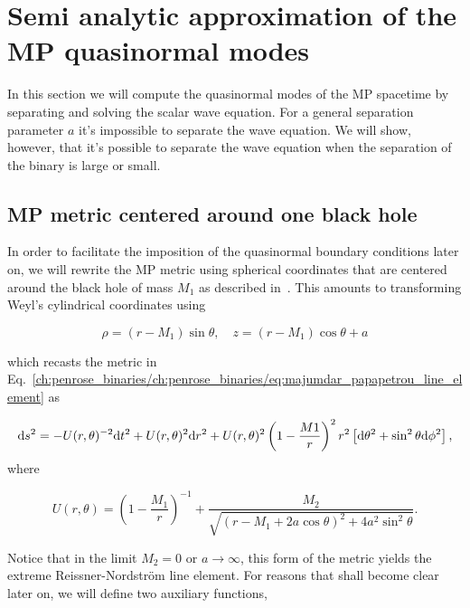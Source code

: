 \section{Semi analytic approximation of the MP quasinormal modes}

In this section we will compute the quasinormal modes of the MP spacetime by separating and solving the scalar wave equation. For a general separation parameter $a$ it's impossible to separate the wave equation. We will show, however, that it's possible to separate the wave equation when the separation of the binary is large or small.

\subsection{MP metric centered around one black hole}

In order to facilitate the imposition of the quasinormal boundary conditions later on, we will rewrite the MP metric using spherical coordinates that are centered around the black hole of mass $M_1$ as described in~\cite{SMERAK2016}. This amounts to transforming Weyl's cylindrical coordinates using

\begin{equation}
  \rho = (r - M_1)\sin\theta, \quad z = (r - M_1)\cos\theta + a
  \label{ch:penrose_binaries/eq:weyl_to_spherical_transform}
\end{equation}

%
which recasts the metric in Eq.~\eqref{ch:penrose_binaries/ch:penrose_binaries/eq:majumdar_papapetrou_line_element} as

\begin{equation}
  \mathrm{d} s^2 = -U(r,\theta)^{-2} \mathrm{d} t^2 +  U(r,\theta)^2\mathrm{d} r^2 + U(r,\theta)^2\left( 1 - \frac{M1}{r} \right)^2r^2\left[ \mathrm{d}\theta^2 + \sin^2\theta\mathrm{d}\phi^2 \right],
  \label{ch:penrose_binaries/eq:majumdar_papapetrou_line_element_spherical}
\end{equation}
%
where

\begin{equation}
  U(r,\theta) = \left(1 - \frac{M_1}{r} \right)^{-1} + \frac{M_2}{\sqrt{(r - M_1 + 2a\cos\theta)^2 + 4a^2\sin^2\theta}}.
  \label{ch:penrose_binaries/eq:mp_metric_potential_spherical}
\end{equation}

Notice that in the limit $M_2 = 0$ or $a\rightarrow\infty$, this form of the metric yields the extreme Reissner-Nordstr\"om line element. For reasons that shall become clear later on, we will define two auxiliary functions,

